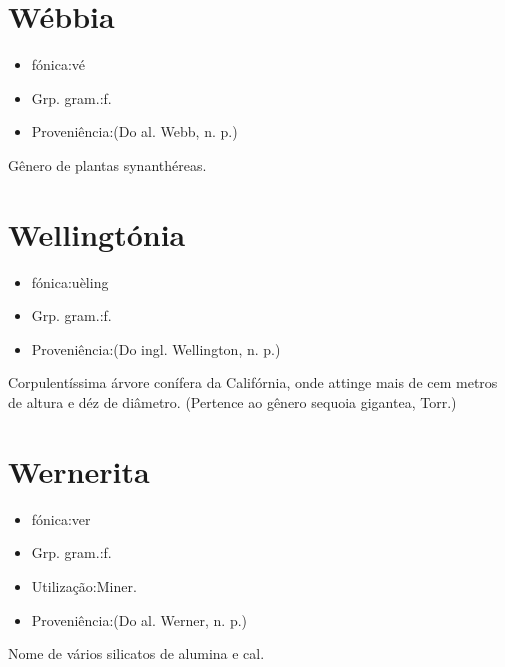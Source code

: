 \documentclass{article}
\begin{document}
\section{Wébbia}
\begin{itemize}
\item {fónica:vé}
\end{itemize}
\begin{itemize}
\item {Grp. gram.:f.}
\end{itemize}
\begin{itemize}
\item {Proveniência:(Do al. \textunderscore Webb\textunderscore , n. p.)}
\end{itemize}
Gênero de plantas synanthéreas.
\section{Wellingtónia}
\begin{itemize}
\item {fónica:uèling}
\end{itemize}
\begin{itemize}
\item {Grp. gram.:f.}
\end{itemize}
\begin{itemize}
\item {Proveniência:(Do ingl. \textunderscore Wellington\textunderscore , n. p.)}
\end{itemize}
Corpulentíssima árvore conífera da Califórnia, onde attinge mais de cem metros de altura e déz de diâmetro.
(Pertence ao gênero \textunderscore sequoia gigantea\textunderscore , Torr.)
\section{Wernerita}
\begin{itemize}
\item {fónica:ver}
\end{itemize}
\begin{itemize}
\item {Grp. gram.:f.}
\end{itemize}
\begin{itemize}
\item {Utilização:Miner.}
\end{itemize}
\begin{itemize}
\item {Proveniência:(Do al. \textunderscore Werner\textunderscore , n. p.)}
\end{itemize}
Nome de vários silicatos de alumina e cal.
\end{document}
